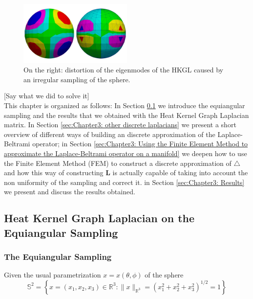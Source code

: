 \begin{figure}
	\label{fig:equiangular distortion}
	\begin{center}
			\includegraphics[width=0.5\textwidth]{../codes/04.imbalanced/img/confront_mixed.png}
	\end{center}
	\caption{On the right: distortion of the eigenmodes of the HKGL caused by an irregular sampling of the sphere.}
\end{figure}

[Say what we did to solve it]\\
This chapter is organized as follows: In Section \ref{sec:Chapter3: Heat Kernel Graph Laplacian on the Equiangular Sampling} we introduce the equiangular sampling and the results that we obtained with the Heat Kernel Graph Laplacian matrix. In Section \ref{sec:Chapter3: other discrete laplacians} we present a short overview of different ways of building an discrete approximation of the Laplace-Beltrami operator; in Section \ref{sec:Chapter3: Using the Finite Element Method to approximate the Laplace-Beltrami operator on a manifold} we deepen how to use the Finite Element Method (FEM) to construct a discrete approximation of $\triangle$ and how this way of constructing $\mathbf L$  is actually capable of taking into account the non uniformity of the sampling and correct it. in Section \ref{sec:Chapter3: Results} we present and discuss the results obtained.
\subsection{Heat Kernel Graph Laplacian on the Equiangular Sampling}
\label{sec:Chapter3: Heat Kernel Graph Laplacian on the Equiangular Sampling}

\subsubsection{The Equiangular Sampling}

Given the usual parametrization $x = x(\theta, \phi)$ of the sphere
$$
\mathbb{S}^{2}=\left\{x=\left(x_{1}, x_{2}, x_{3}\right) \in \mathbb{R}^{3} :\|x\|_{\mathbb{R}^{3}}=\left(x_{1}^{2}+x_{2}^{2}+x_{3}^{2}\right)^{1 / 2}=1\right\}
$$

